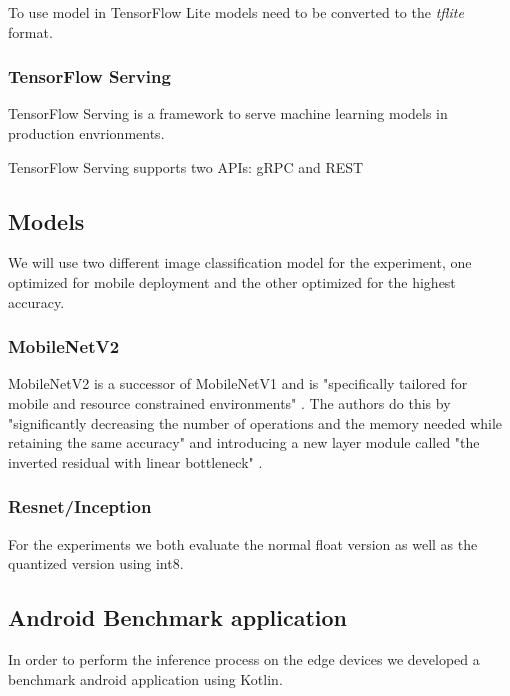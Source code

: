 To use model in TensorFlow Lite models need to be converted to the \emph{tflite} format.
\subsubsection{TensorFlow Serving}
TensorFlow Serving is a framework to serve machine learning models in production envrionments. 

TensorFlow Serving supports two APIs: gRPC and REST
\subsection{Models}
We will use two different image classification model for the experiment, one optimized for mobile deployment and the other optimized for the highest accuracy.

\subsubsection{MobileNetV2}
MobileNetV2 is a successor of MobileNetV1 and is "specifically tailored for mobile and resource
constrained environments" \cite{DBLP:journals/corr/abs-1801-04381}. The authors do this by "significantly decreasing the number of operations and the memory needed while retaining the same accuracy"  \cite{DBLP:journals/corr/abs-1801-04381} and introducing a new layer module called "the
inverted residual with linear bottleneck" \cite{DBLP:journals/corr/abs-1801-04381}.

\subsubsection{Resnet/Inception}

For the experiments we both evaluate the normal float version as well as the quantized version using int8.
\subsection{Android Benchmark application}
In order to perform the inference process on the edge devices we developed a benchmark android application using Kotlin. 

